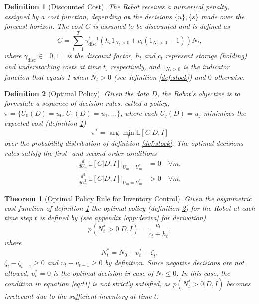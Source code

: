 \documentclass[a4paper,12pt]{article}
\newtheorem{theorem}{Theorem}
\newtheorem{definition}{Definition}
\begin{document}
	\begin{definition}[Discounted Cost]
		\label{def:cost}
		The Robot receives a numerical penalty, assigned by a cost function, depending on the decisions $\{u\}, \{s\}$ made over the forecast horizon. The cost $C$ is assumed to be discounted and is defined as
		\begin{equation}
			C = \sum_{t=1}^{T} \gamma_{\text{disc}}^{t-1} 
			\left( h_t 1_{N_t > 0} + c_t (1_{N_t > 0} - 1) \right) N_t,
			\label{eq:cost}
		\end{equation}
		where $\gamma_{\text{disc}} \in [0,1]$ is the discount factor, $h_t$ and $c_t$ represent 
		storage (holding) and understocking costs at time $t$, respectively, and 
		$1_{N_t > 0}$ is the indicator function that equals 1 when $N_t > 0$ (see definition \ref{def:stock}) and $0$ otherwise.
	\end{definition}
	
	\begin{definition}[Optimal Policy]
		\label{def:policy}
		Given the data $D$, the Robot’s objective is to formulate a sequence of decision rules, called a policy, $\pi = \{U_0(D)=u_0, U_1(D)=u_1, \dots\}$, where each $U_j(D) = u_j$ minimizes the expected cost (definition \ref{def:cost})
		\begin{equation}
			\pi^* = \arg \min_{\pi} \mathbb{E}[C| D, I]
		\end{equation}
		over the probability distribution of definition \ref{def:stock}. The optimal decisions rules satisfy the first- and second-order conditions
		\begin{equation}
			\begin{split}
				\frac{d}{dU_m} \mathbb{E}[C | D, I] \Big|_{U_m = U_m^*} &= 0 \quad \forall m,\\
				\frac{d^2}{dU_m^2} \mathbb{E}[C | D, I] \Big|_{U_m = U_m^*} & > 0 \quad \forall m.
			\end{split}
			\label{eq:conditions}
		\end{equation}
	\end{definition}

	\begin{theorem}[Optimal Policy Rule for Inventory Control]
		\label{theorem:opt_policy}
		Given the asymmetric cost function of definition \ref{def:cost} the optimal policy (definition \ref{def:policy}) for the Robot at each time step $t$ is defined by (see appendix \ref{app:deriva} for derivation)
		\begin{equation}
			p(N_t^* > 0 | D, I) = \frac{c_t}{c_t + h_t},
			\label{eq:t1}
		\end{equation}
		where
		\begin{equation}
			N_t^* = N_0 +\upsilon_t^*-\zeta_t,
		\end{equation}
		$\zeta_t-\zeta_{t-1}\geq 0$ and $\upsilon_t-\upsilon_{t-1}\geq 0$ by definition. Since negative decisions are not allowed, $\upsilon_t^* = 0$ is the optimal decision in case of $N_t\leq 0$. In this case, the condition in equation \eqref{eq:t1} is not strictly satisfied, as $p(N_t^* > 0 | D, I)$ becomes irrelevant due to the sufficient inventory at time $t$.
	\end{theorem}
	
\end{document}
